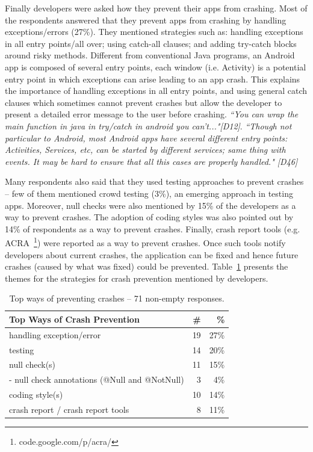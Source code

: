 {Finally developers were asked how they prevent their apps from crashing. Most of the respondents answered that they prevent apps from crashing by handling exceptions/errors (27\%). They mentioned strategies such as: handling exceptions in all entry points/all over; using catch-all clauses; and adding try-catch blocks around risky methods. Different from conventional Java programs, an Android app is composed of several entry points, each window (i.e. Activity) is a potential entry point in which exceptions can arise leading to an app crash. This explains the importance of handling exceptions in all entry points, and using general catch clauses which sometimes cannot prevent crashes but allow the developer to present a detailed error message to the user before crashing.  \emph{``You can wrap the main function in java in try/catch in android you can't..."[D12]}. \emph{``Though not particular to Android, most Android apps have several different entry points: Activities, Services, etc, can be started by different services; same thing with events. It may be hard to ensure that all this cases are properly handled." [D46]}

Many respondents also said that they used testing approaches to prevent crashes -- few of them mentioned crowd testing (3\%), an emerging approach in testing apps. Moreover, null checks were also mentioned by 15\% of the developers as a way to prevent crashes.
The adoption of coding styles was also pointed out by 14\% of respondents as a way to prevent crashes. Finally, crash report tools (e.g. ACRA~\footnote{code.google.com/p/acra/}) were reported as a way to prevent crashes. Once such tools notify developers about current crashes, the application can be fixed and hence future crashes (caused by what was fixed) could be prevented. Table~\ref{tab:topprevent} presents the themes for the strategies for crash prevention mentioned by developers.

\bigskip


\bigskip

\begin{table}
\scriptsize
\centering
\begin{tabular}{lrr}
\hline
\bfseries{Top Ways of Crash Prevention} & \bfseries{\#} & \bfseries{\%} \\
\hline
handling exception/error  & 19 &	27\% \\
testing &	14 &	20\% \\
null check(s) &	11 &	15\% \\
- null check annotations (@Null and @NotNull)	& 3 & 	4\% \\
coding style(s)	& 10 &	14\% \\
crash report / crash report tools &	8	& 11\% \\
\hline
\end{tabular}
\caption{Top ways of preventing crashes -- 71 non-empty responses. }
\label{tab:topprevent}
\end{table}

}
